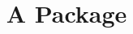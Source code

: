 \documentclass{ximera}
\title{A Package}
\begin{document}
\begin{abstract}
\end{abstract}

\maketitle





\begin{sectionOutcomes}



\end{sectionOutcomes}
\end{document}
